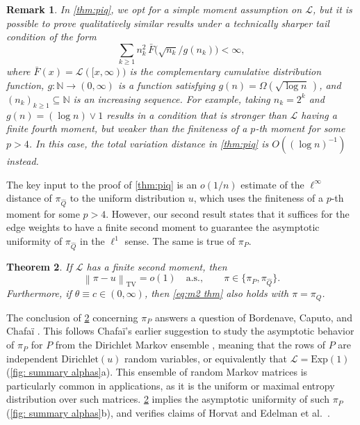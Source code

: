 \documentclass[12pt]{amsart}
\newcommand\wh[1]{\widehat{#1}}
\newtheorem{theorem}{Theorem}[section]
\newtheorem{remark}[theorem]{Remark}
\newcommand{\N}{\mathbb{N}}
\DeclareMathOperator{\1}{\mathbf{1}}
\begin{document}
\begin{remark}\label{rem: tail}
In \cref{thm:piq}, we opt for a simple moment assumption on $\mathcal{L}$, but it is possible to prove qualitatively similar results under a technically sharper tail condition of the form
\[
\sum_{k \geq 1} n_k^2 \, \bar{F} \big(\sqrt{n_k}/g(n_k)\big) < \infty,
\]
where $\bar{F}(x) = \mathcal{L}([x,\infty))$ is the complementary cumulative distribution function, $g: \N \to (0,\infty)$ is a function satisfying $g(n) = \Omega (\sqrt{\log n}\,)$, and $(n_k)_{k \geq 1} \subseteq \N$ is an increasing sequence. For example, taking $n_k = 2^k$ and $g(n) = (\log n) \vee 1$ results in a condition that is stronger than $\mathcal{L}$ having a finite fourth moment, but weaker than the finiteness of a $p$-th moment for some $p > 4$. In this case, the total variation distance in \cref{thm:piq} is $O ((\log n)^{-1})$ instead.
\end{remark}

The key input to the proof of \cref{thm:piq} is an $o(1/n)$ estimate of the $\ell^\infty$ distance of $\pi_{\widehat{Q}}$ to the uniform distribution $u$, which uses the finiteness of a $p$-th moment for some $p > 4$. However, our second result states that it suffices for the edge weights to have a finite second moment to guarantee the asymptotic uniformity of $\pi_{\wh{Q}}$ in the $\ell^1$ sense. The same is true of $\pi_P$.

\begin{theorem}\label{thm:m2}
	If $\mathcal{L}$ has a finite second moment, then 
	\begin{equation}\label{eq:m2 thm}
		\left\| \pi - u \right\|_{\mathrm{TV}} = o(1) \quad \mathrm{a.s.}, \quad\quad \pi \in \{\pi_P,\pi_{\wh{Q}}\}. 
	\end{equation}
	Furthermore, if $\theta \equiv c \in (0,\infty)$, then \cref{eq:m2 thm} also holds with $\pi = \pi_Q$.
\end{theorem}

The conclusion of \cref{thm:m2} concerning $\pi_P$ answers a question of Bordenave, Caputo, and Chafa{\"i} \cite{MR2892961}. This follows Chafa{\"i}'s earlier suggestion to study the asymptotic behavior of $\pi_P$ for $P$ from the Dirichlet Markov ensemble \cite{MR2575404}, meaning that the rows of $P$ are independent $\mathrm{Dirichlet}(u)$ random variables, or equivalently that $\mathcal{L} = \mathrm{Exp}(1)$ (\cref{fig: summary alphas}a). This ensemble of random Markov matrices is particularly common in applications, as it is the uniform or maximal entropy distribution over such matrices. \cref{thm:m2} implies the asymptotic uniformity of such $\pi_P$ (\cref{fig: summary alphas}b), and verifies claims of Horvat \cite{MR2539237} and Edelman et al.\ \cite{edelman2024the}.
\end{document}
